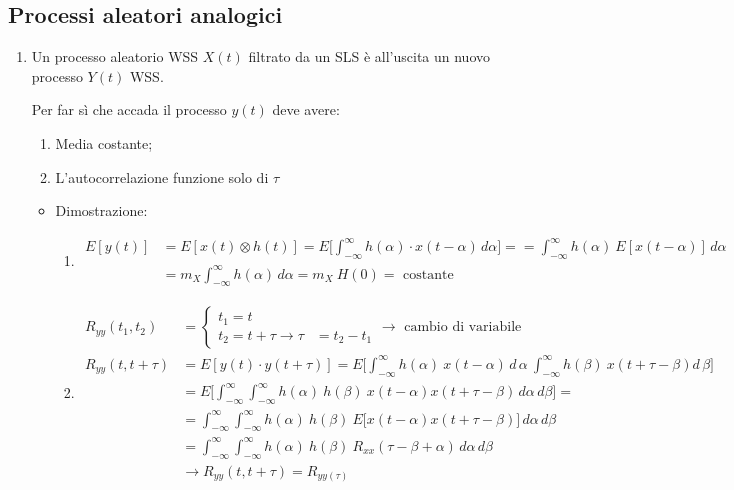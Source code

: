 \documentclass[
]{article}
\providecommand{\tightlist}{%
  \setlength{\itemsep}{0pt}\setlength{\parskip}{0pt}}
\begin{document}
\subsection{Processi aleatori
analogici}\label{processi-aleatori-analogici}

\begin{enumerate}
\def\labelenumi{\arabic{enumi}.}
\item
  Un processo aleatorio WSS \(X(t)\) filtrato da un SLS è all'uscita un
  nuovo processo \(Y(t)\) WSS.

  Per far sì che accada il processo \(y(t)\) deve avere:

  \begin{enumerate}
  \def\labelenumii{\arabic{enumii}.}
  \tightlist
  \item
    Media costante;
  \item
    L'autocorrelazione funzione solo di \(\tau\)
  \end{enumerate}

  \begin{itemize}
  \tightlist
  \item
    Dimostrazione:

    \begin{enumerate}
    \def\labelenumii{\arabic{enumii}.}
    \tightlist
    \item
      \begin{align*}
       E[y(t)]&= E[x(t)\otimes h(t)]= E\Big[\int_{-\infty}^{\infty} h(\alpha)\cdot x(t-\alpha) \,d\alpha\Big] =
       =\int_{-\infty}^{\infty} h(\alpha) \ E[x(t-\alpha)] \,d\alpha \\ &= m_{X} \int_{-\infty}^{\infty} h(\alpha) \,d\alpha = m_{X} \ H(0) =  \text{ costante}
       \end{align*}
    \item
      \begin{align*}
       R_{yy}(t_{1},t_{2}) &= \left\{ \begin{array}{lcl}
       t_{1} =t \\
       t_{2} = t + \tau \to \tau &= t_{2}-t_{1}
       \end{array} \right. \to \text{ cambio di variabile} \\
       R_{yy}(t, t + \tau) &= E[y(t)\cdot y(t+\tau)] = E\Big[\int_{-\infty}^{\infty} h(\alpha) \ x(t-\alpha)\,d\,\alpha \ \int_{-\infty}^{\infty}h(\beta) \ x(t+\tau -\beta) d\,\beta\Big]\\
       &=E\Big[\int_{-\infty}^{\infty}\int_{-\infty}^{\infty} h(\alpha) \ h(\beta) \ x(t-\alpha) x(t+\tau -\beta) \,d\alpha \,d\beta \Big]= \\
       &=\int_{-\infty}^{\infty}\int_{-\infty}^{\infty} h(\alpha) \ h(\beta) \ E \Big[x(t-\alpha) x(t+\tau -\beta) \Big] \,d\alpha \,d\beta \\
       &=\int_{-\infty}^{\infty}\int_{-\infty}^{\infty} h(\alpha) \ h(\beta) \ R_{xx}(\tau -\beta +\alpha) \,d\alpha \,d\beta \\&\to R_{yy}(t, t+\tau) = R_{yy(\tau)}
       \end{align*}
    \end{enumerate}


\end{itemize}
\end{enumerate}
\end{document}
